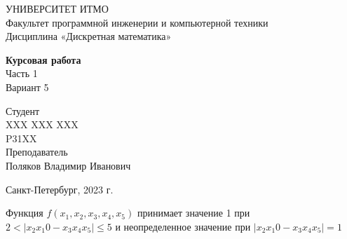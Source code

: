\documentclass{article}
\begin{document}
\begin{center}
    УНИВЕРСИТЕТ ИТМО \\
    Факультет программной инженерии и компьютерной техники \\
    Дисциплина «Дискретная математика»
    
    \vspace{5cm}

    \large
    \textbf{Курсовая работа} \\
    Часть 1 \\
    Вариант 5
\end{center}

\vspace{2cm}

\hfill\begin{minipage}{0.35\linewidth}
Студент \\
XXX XXX XXX \\
P31XX \\

Преподаватель \\
Поляков Владимир Иванович
\end{minipage}

\vfill

\begin{center}
    Санкт-Петербург, 2023 г.
\end{center}

\thispagestyle{empty}
\newpage

Функция $f(x_1, x_2, x_3, x_4, x_5)$ принимает значение 1 при $2 < |x_2 x_1 0 - x_3 x_4 x_5| \le 5$ и неопределенное значение при $|x_2 x_1 0 - x_3 x_4 x_5| = 1$
\end{document}
